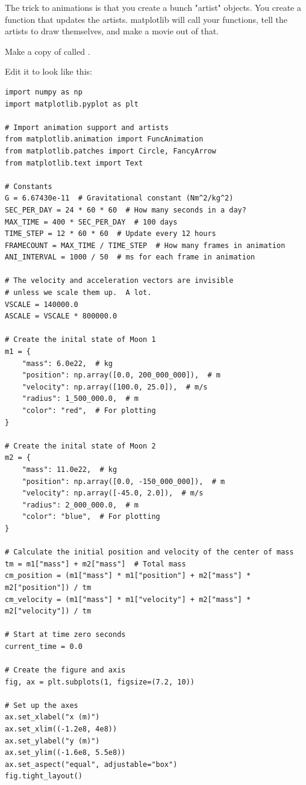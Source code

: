 The trick to animations is that you create a bunch "artist" objects.  You create a function that updates the 
artists.   matplotlib will call your functions,  tell the artists to draw themselves,  and make a movie out of that.

Make a copy of  called . 

Edit it to look like this:
\begin{verbatim}
import numpy as np
import matplotlib.pyplot as plt

# Import animation support and artists
from matplotlib.animation import FuncAnimation
from matplotlib.patches import Circle, FancyArrow
from matplotlib.text import Text

# Constants
G = 6.67430e-11  # Gravitational constant (Nm^2/kg^2)
SEC_PER_DAY = 24 * 60 * 60  # How many seconds in a day?
MAX_TIME = 400 * SEC_PER_DAY  # 100 days
TIME_STEP = 12 * 60 * 60  # Update every 12 hours
FRAMECOUNT = MAX_TIME / TIME_STEP  # How many frames in animation
ANI_INTERVAL = 1000 / 50  # ms for each frame in animation

# The velocity and acceleration vectors are invisible
# unless we scale them up.  A lot.
VSCALE = 140000.0
ASCALE = VSCALE * 800000.0

# Create the inital state of Moon 1
m1 = {
    "mass": 6.0e22,  # kg
    "position": np.array([0.0, 200_000_000]),  # m
    "velocity": np.array([100.0, 25.0]),  # m/s
    "radius": 1_500_000.0,  # m
    "color": "red",  # For plotting
}

# Create the inital state of Moon 2
m2 = {
    "mass": 11.0e22,  # kg
    "position": np.array([0.0, -150_000_000]),  # m
    "velocity": np.array([-45.0, 2.0]),  # m/s
    "radius": 2_000_000.0,  # m
    "color": "blue",  # For plotting
}

# Calculate the initial position and velocity of the center of mass
tm = m1["mass"] + m2["mass"]  # Total mass
cm_position = (m1["mass"] * m1["position"] + m2["mass"] * m2["position"]) / tm
cm_velocity = (m1["mass"] * m1["velocity"] + m2["mass"] * m2["velocity"]) / tm

# Start at time zero seconds
current_time = 0.0

# Create the figure and axis
fig, ax = plt.subplots(1, figsize=(7.2, 10))

# Set up the axes
ax.set_xlabel("x (m)")
ax.set_xlim((-1.2e8, 4e8))
ax.set_ylabel("y (m)")
ax.set_ylim((-1.6e8, 5.5e8))
ax.set_aspect("equal", adjustable="box")
fig.tight_layout()


\end{verbatim}
